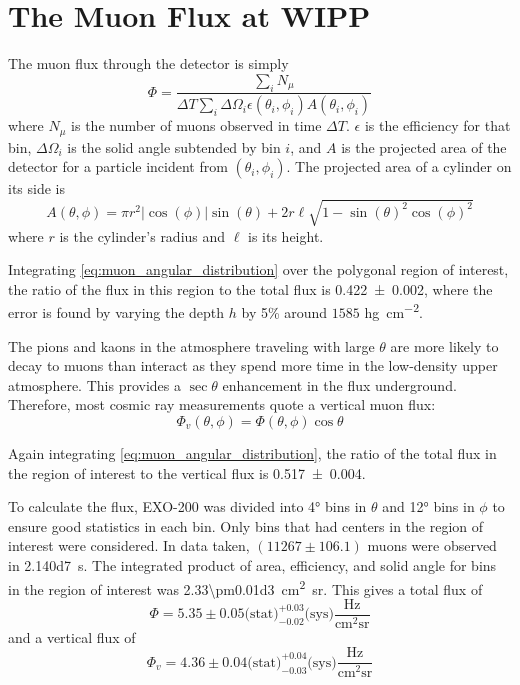 \documentclass[herrin-thesis.tex]{subfiles}
\begin{document}
\section{The Muon Flux at WIPP}
\label{sec:muon:wipp}
The muon flux through the detector is simply
\begin{equation}
\label{eq:muon_fluxdef}
\Phi = \frac{\sum_{i}N_{\mu}}{ \Delta T\sum_{i}\Delta\Omega_i \epsilon(\theta_i, \phi_i) A(\theta_i, \phi_i)}
\end{equation}
where \(N_\mu\) is the number of muons observed in time \(\Delta T\). \(\epsilon\) is the efficiency for that bin, \(\Delta\Omega_i\) is the solid angle subtended by bin \(i\), and \(A\) is the projected area of the detector for a particle incident from \((\theta_i, \phi_i)\). The projected area of a cylinder on its side is
\begin{equation}
A(\theta,\phi) = \pi r^2 |\cos(\phi)|\sin(\theta) + 2 r \ell \sqrt{1-\sin(\theta)^2 \cos(\phi)^2}
\end{equation}
where \(r\) is the cylinder's radius and \(\ell\) is its height.

Integrating \cref{eq:muon_angular_distribution} over the polygonal region of interest, the ratio of the flux in this region to the total flux is \num{0.422\pm0.002}, where the error is found by varying the depth \(h\) by 5\% around \(1585\) \si{\hecto\g\per\square\cm}.

The pions and kaons in the atmosphere traveling with large \(\theta\) are more likely to decay to muons than interact as they spend more time in the low-density upper atmosphere. This provides a \(\sec\theta\) enhancement in the flux underground. Therefore, most cosmic ray measurements quote a vertical muon flux:
\begin{equation}
\label{eq:muon_vfluxdef}
\Phi_v(\theta, \phi) = \Phi(\theta, \phi)\cos\theta
\end{equation}

Again integrating \cref{eq:muon_angular_distribution}, the ratio of the total flux in the region of interest to the vertical flux is \num{0.517\pm0.004}.

To calculate the flux, EXO-200 was divided into \ang{4} bins in \(\theta\) and \ang{12} bins in \(\phi\) to ensure good statistics in each bin. Only bins that had centers in the region of interest were considered. In data taken, \((11267\pm106.1)\) muons were observed in \SI{2.140d7}{\second}. The integrated product of area, efficiency, and solid angle for bins in the region of interest was \SI{2.33\pm0.01d3}{\square\cm\steradian}. This gives a total flux of
\begin{equation}
\label{eq:muon_flux_result}
\Phi = 5.35\pm0.05\text{(stat)}^{+0.03}_{-0.02}\text{(sys)}\frac{\text{Hz}}{\text{cm}^2\text{sr}}
\end{equation}
and a vertical flux of
\begin{equation}
\label{eq:muon_vflux_result}
\Phi_v = 4.36\pm0.04\text{(stat)}^{+0.04}_{-0.03}\text{(sys)}\frac{\text{Hz}}{\text{cm}^2\text{sr}}
\end{equation}
\end{document}

